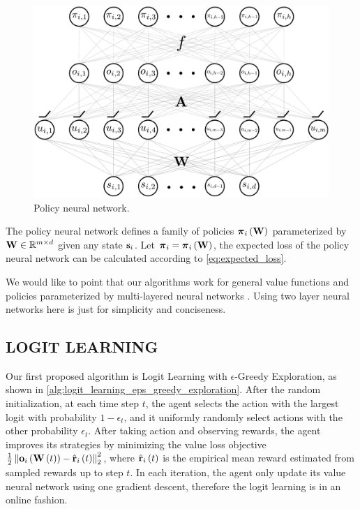 \begin{figure}[t]
\vskip 0.2in
\begin{center}
\centerline{\includegraphics[width=\columnwidth]{nn_policy.pdf}}
\caption{Policy neural network.}
\label{fig:nn_policy}
\end{center}
\vskip -0.2in
\end{figure}

The policy neural network defines a family of policies ${\boldsymbol{\pi}}_i \left( {\mathbf{W}} \right)$ parameterized by ${\mathbf{W}} \in {\mathbb{R}}^{m \times d}$ given any state ${\mathbf{s}}_i$. Let ${\boldsymbol{\pi}}_i = {\boldsymbol{\pi}}_i \left( {\mathbf{W}} \right)$, the expected loss of the policy neural network can be calculated according to \cref{eq:expected_loss}.

We would like to point that our algorithms work for general value functions and policies parameterized by multi-layered neural networks \citep{allen2018convergenceA,allen2018convergenceB,du2018gradientA}. Using two layer neural networks here is just for simplicity and conciseness.

\subsection{LOGIT LEARNING}
\label{subsec:logit_learning}

Our first proposed algorithm is Logit Learning with $\epsilon$-Greedy Exploration, as shown in \cref{alg:logit_learning_eps_greedy_exploration}. After the random initialization, at each time step $t$, the agent selects the action with the largest logit with probability $1 - \epsilon_t$, and it uniformly randomly select actions with the other probability $\epsilon_t$. After taking action and observing rewards, the agent improves its strategies by minimizing the value loss objective $\frac{1}{2} \left\| {\mathbf{o}}_i\left( {\mathbf{W}}\left(t\right)\right) - \hat{{\mathbf{r}}}_i\left(t\right) \right\|_2^2$, where $\hat{{\mathbf{r}}}_i\left(t\right)$ is the empirical mean reward estimated from sampled rewards up to step $t$. In each iteration, the agent only update its value neural network using one gradient descent, therefore the logit learning is in an online fashion.


